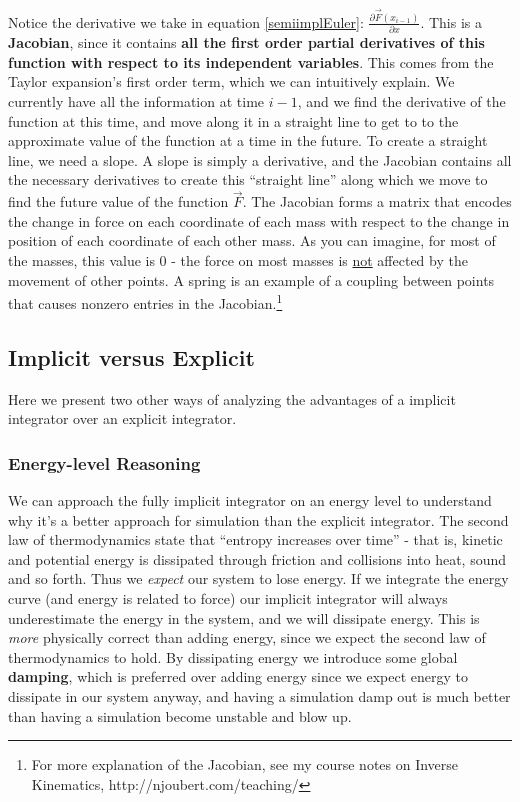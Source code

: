 \documentclass[]{article}
\begin{document}
Notice the derivative we take in equation \ref{semiimplEuler}: $\frac{\partial \vec{F}(x_{i-1})}{\partial x}$. This is a \textbf{Jacobian}, since it contains \textbf{all the first order partial derivatives of this function with respect to its independent variables}. This comes from the Taylor expansion's first order term, which we can intuitively explain. We currently have all the information at time $i-1$, and we find the derivative of the function at this time, and move along it in a straight line to get to to the approximate value of the function at a time in the future. To create a straight line, we need a slope. A slope is simply a derivative, and the Jacobian contains all the necessary derivatives to create this ``straight line'' along which we move to find the future value of the function $\vec{F}$. The Jacobian forms a matrix that encodes the change in force on each coordinate of each mass with respect to the change in position of each coordinate of each other mass. As you can imagine, for most of the masses, this value is 0 - the force on most masses is \underline{not} affected by the movement of other points. A spring is an example of a coupling between points that causes nonzero entries in the Jacobian.\footnote{For more explanation of the Jacobian, see my course notes on Inverse Kinematics, http://njoubert.com/teaching/}

\subsection{Implicit versus Explicit}

Here we present two other ways of analyzing the advantages of a implicit integrator over an explicit integrator.

\subsubsection{Energy-level Reasoning}

We can approach the fully implicit integrator on an energy level to understand why it's a better approach for simulation than the explicit integrator. The second law of thermodynamics state that ``entropy increases over time'' - that is, kinetic and potential energy is dissipated through friction and collisions into heat, sound and so forth. Thus we \emph{expect} our system to lose energy. If we integrate the energy curve (and energy is related to force) our implicit integrator will always underestimate the energy in the system, and we will dissipate energy. This is \emph{more} physically correct than adding energy, since we expect the second law of thermodynamics to hold. By dissipating energy we introduce some global \textbf{damping}, which is preferred over adding energy since we expect energy to dissipate in our system anyway, and having a simulation damp out is much better than having a simulation become unstable and blow up.
\end{document}
